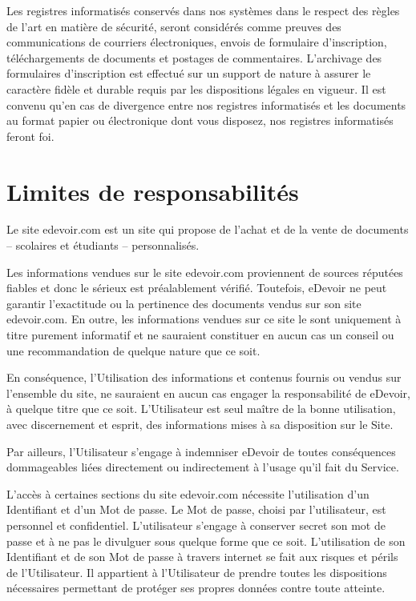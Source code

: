 Les registres informatisés conservés dans nos systèmes dans le respect des règles de l'art en matière de sécurité, seront considérés comme preuves des communications de courriers électroniques, envois de formulaire d'inscription, téléchargements de documents et postages de commentaires. L'archivage des formulaires d'inscription est effectué sur un support de nature à assurer le caractère fidèle et durable requis par les dispositions légales en vigueur. Il est convenu qu'en cas de divergence entre nos registres informatisés et les documents au format papier ou électronique dont vous disposez, nos registres informatisés feront foi.

 
\section{Limites de responsabilités}

Le site edevoir.com est un site qui propose de l'achat et de la vente de documents -- scolaires et étudiants -- personnalisés.

Les informations vendues sur le site edevoir.com proviennent de sources réputées fiables et donc le sérieux est préalablement vérifié. Toutefois, eDevoir ne peut garantir l'exactitude ou la pertinence des documents vendus sur son site edevoir.com. En outre, les informations vendues sur ce site le sont uniquement à titre purement informatif et ne sauraient constituer en aucun cas un conseil ou une recommandation de quelque nature que ce soit.

En conséquence, l'Utilisation des informations et contenus fournis ou vendus sur l'ensemble du site, ne sauraient en aucun cas engager la responsabilité de eDevoir, à quelque titre que ce soit. L'Utilisateur est seul maître de la bonne utilisation, avec discernement et esprit, des informations mises à sa disposition sur le Site.

Par ailleurs, l’Utilisateur s’engage à indemniser eDevoir de toutes conséquences dommageables liées directement ou indirectement à l’usage qu’il fait du Service.

L'accès à certaines sections du site edevoir.com nécessite l'utilisation d'un Identifiant et d'un Mot de passe. Le Mot de passe, choisi par l'utilisateur, est personnel et confidentiel. L'utilisateur s'engage à conserver secret son mot de passe et à ne pas le divulguer sous quelque forme que ce soit. L'utilisation de son Identifiant et de son Mot de passe à travers internet se fait aux risques et périls de l'Utilisateur. Il appartient à l'Utilisateur de prendre toutes les dispositions nécessaires permettant de protéger ses propres données contre toute atteinte.


